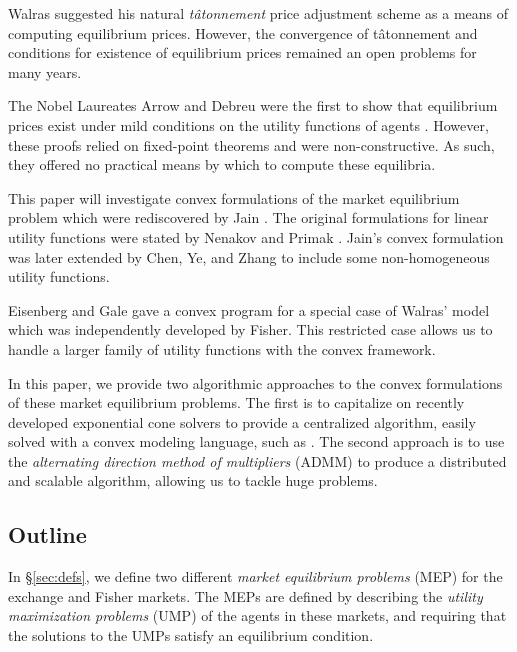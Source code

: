 \documentclass[12pt]{article}
\newcommand{\tatonnement}{t\^atonnement}
\begin{document}
Walras suggested his natural \emph{\tatonnement{}} price adjustment scheme as a
means of computing equilibrium prices. However, the convergence of
\tatonnement{} and conditions for existence of equilibrium prices remained an
open problems for many years.

The Nobel Laureates Arrow and Debreu were the first to show that equilibrium
prices exist under mild conditions on the utility functions of agents
\cite{arrow1954existence}. However, these proofs relied on fixed-point theorems
and were non-constructive. As such, they offered no practical means by which to
compute these equilibria.

This paper will investigate convex formulations of the market equilibrium
problem which were rediscovered by Jain \cite{jain2007polynomial}. The original
formulations for linear utility functions %
were stated by Nenakov
and Primak \cite{nenakov1983algorithm}. Jain's convex formulation was later
extended by Chen, Ye, and Zhang \cite{chen2007note, chen2010equilibrium} to
include some non-homogeneous utility functions.

Eisenberg and Gale \cite{eisenberg1959consensus, gale1960theory,
eisenberg1961aggregation} gave a convex program for a special case of Walras'
model which was independently developed by Fisher. %
This
restricted case allows us to handle a larger family of utility functions with
the convex framework.

In this paper, we provide two algorithmic approaches to the convex formulations
of these market equilibrium problems. The first is to capitalize on recently
developed exponential cone solvers \cite{scs} to provide a centralized
algorithm, easily solved with a convex modeling language, such as \cite{cvxpy,
cvx}. The second approach is to use the \emph{alternating direction method of
multipliers} (ADMM) \cite{boyd2011distributed} to produce a distributed and
scalable algorithm, allowing us to tackle huge problems.

\subsection{Outline}

In \S\ref{sec:defs}, we define two different \emph{market equilibrium problems}
(MEP) for the exchange and Fisher markets. The MEPs are defined by describing
the \emph{utility maximization problems} (UMP) of the agents in these markets,
and requiring that the solutions to the UMPs satisfy an equilibrium condition.
\end{document}
